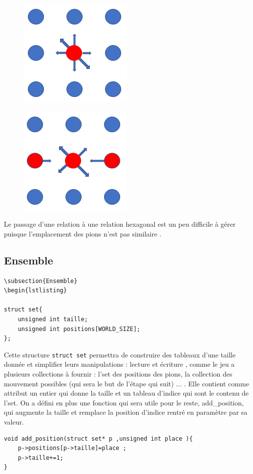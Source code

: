 \documentclass[a4paper]{article}
\begin{document}
  \begin{figure}
    \centering
    \begin{minipage}{.5\textwidth}
      \centering
      \includegraphics[width=.4\linewidth]{3.png}
      \label{fig:test1}
    \end{minipage}%
    \begin{minipage}{.5\textwidth}
      \centering
      \includegraphics[width=.4\linewidth]{4.png}
      \label{fig:test2}
    \end{minipage}
    \end{figure}
Le passage d'une relation à une relation hexagonal est un peu difficile à gérer puisque l'emplacement des pions n'est pas similaire .  

\subsection{Ensemble}
\begin{lstlisting}
\subsection{Ensemble}
\begin{lstlisting}

struct set{
    unsigned int taille;
    unsigned int positions[WORLD_SIZE];
};
\end{lstlisting}
Cette structure \lstinline|struct set|  permettra de construire des tableaux d’une taille donnée et simplifier leurs 
manipulations : lecture et écriture , comme le jeu a plusieurs collections à fournir : l’set des positions des pions, la 
collection des mouvement possibles (qui sera le but de l’étape qui suit) ... . Elle contient comme attribut un entier qui donne la 
taille et un tableau d'indice qui sont le contenu de l'set.
On a défini en plus une fonction qui sera utile pour le reste, add\_position, qui augmente la taille et remplace la position d’indice 
rentré en paramètre par sa valeur. 
\begin{lstlisting}
void add_position(struct set* p ,unsigned int place ){
    p->positions[p->taille]=place ;
    p->taille+=1;
}
\end{lstlisting}
\end{document}
